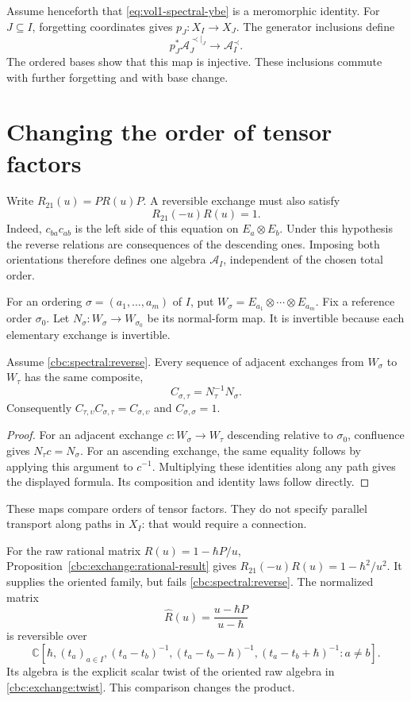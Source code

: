 Assume henceforth that \eqref{eq:vol1-spectral-ybe} is a meromorphic
identity.  For $J\subseteq I$, forgetting coordinates gives
$p_J:X_I\to X_J$.  The generator inclusions define
\[
 p_J^*\mathcal A_J^{\prec|_J}\longrightarrow\mathcal A_I^{\prec}.
\]
The ordered bases show that this map is injective.  These inclusions
commute with further forgetting and with base change.

\section{Changing the order of tensor factors}
Write $R_{21}(u)=P R(u)P$.  A reversible exchange must also satisfy
\begin{equation}\label{cbc:spectral:reverse}
 R_{21}(-u)R(u)=1.
\end{equation}
Indeed, $c_{ba}c_{ab}$ is the left side of this equation on
$E_a\otimes E_b$.  Under this hypothesis the reverse relations are
consequences of the descending ones.  Imposing both orientations therefore
defines one algebra $\mathcal A_I$, independent of the chosen total order.

For an ordering $\sigma=(a_1,\ldots,a_m)$ of $I$, put
$W_\sigma=E_{a_1}\otimes\cdots\otimes E_{a_m}$.
Fix a reference order $\sigma_0$.  Let
$N_\sigma:W_\sigma\to W_{\sigma_0}$ be its normal-form map.
It is invertible because each elementary exchange is invertible.

\begin{proposition}\label{cbc:spectral:transport}
Assume \eqref{cbc:spectral:reverse}.  Every sequence of adjacent exchanges
from $W_\sigma$ to $W_\tau$ has the same composite,
\[
 C_{\sigma,\tau}=N_\tau^{-1}N_\sigma.
\]
Consequently $C_{\tau,\upsilon}C_{\sigma,\tau}=C_{\sigma,\upsilon}$ and
$C_{\sigma,\sigma}=1$.
\end{proposition}
\begin{proof}
For an adjacent exchange $c:W_\sigma\to W_\tau$ descending relative to
$\sigma_0$, confluence gives $N_\tau c=N_\sigma$.
For an ascending exchange, the same equality follows by applying this
argument to $c^{-1}$.  Multiplying these identities along any path gives
the displayed formula.  Its composition and identity laws follow directly.
\end{proof}

These maps compare orders of tensor factors.  They do not specify parallel
transport along paths in $X_I$: that would require a connection.

For the raw rational matrix $R(u)=1-\hbar P/u$,
Proposition~\ref{cbc:exchange:rational-result} gives
$R_{21}(-u)R(u)=1-\hbar^2/u^2$.
It supplies the oriented family, but fails \eqref{cbc:spectral:reverse}.
The normalized matrix
\[
 \widehat R(u)=\frac{u-\hbar P}{u-\hbar}
\]
is reversible over
\[
 \mathbb C[\hbar,(t_a)_{a\in I},
       (t_a-t_b)^{-1},(t_a-t_b-\hbar)^{-1},(t_a-t_b+\hbar)^{-1}:a\ne b].
\]
Its algebra is the explicit scalar twist of the oriented raw algebra in
\eqref{cbc:exchange:twist}.  This comparison changes the product.

